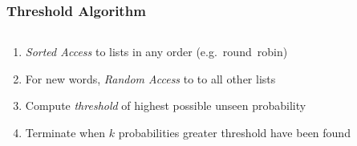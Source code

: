 \documentclass{presentation}
\begin{document}
\begin{frame}
  \frametitle{Threshold Algorithm}

  \begin{columns}[T]
    \begin{column}{.4\textwidth}
      \begin{enumerate}
        \item<3-> \alert< 8,12,16,18,22>{\emph{Sorted Access} to lists in any order (e.g.~round~robin)}
        \vspace{0.1cm}
        \item<4-> \alert< 9,13,19>{For new words, \emph{Random Access} to to all other lists}
        \vspace{0.1cm}
        \item<5-> \alert<11,15,17,21,23>{Compute \emph{threshold} of highest possible unseen probability}
        \vspace{0.1cm}
        \item<6-> \alert<24>{Terminate when $k$ probabilities greater threshold have been found}
      \end{enumerate}
    \end{column}
    \begin{column}{.6\textwidth}
      \vspace{-0.25cm}
\end{column}
\end{columns}
\end{frame}
\end{document}
